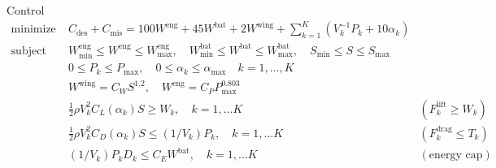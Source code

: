 \begin{chapter}{Control}
    \[\begin{array}{lll}
    \text{minimize} \; & C_{\mathrm{des}} + C_{\mathrm{mis}} = 100W^{\mathrm{eng}} + 45W^{\mathrm{bat}} + 2W^{\mathrm{wing}} + \sum_{k=1}^{K}\left(V_k^{-1}P_k + 10\alpha_k \right) &  \\
    \text{subject to} 
                      & W_{\min }^{\mathrm{eng}} \leq W^{\mathrm{eng}} \leq W_{\max }^{\mathrm{eng}},
                      \quad W_{\min }^{\mathrm{bat}} \leq W^{\mathrm{bat}} \leq W_{\max }^{\mathrm{bat}}, 
                      \quad S_{\min } \leq S \leq S_{\max } & \\
                      & 0 \le P_k \le P_{\mathrm{max}}, \quad 0 \le \alpha_k \le \alpha_{\mathrm{max}} \quad k = 1, \ldots, K & \\
                      & W^{\mathrm{wing}} = C_{W}S^{1.2}, \quad W^{\mathrm{eng}} = C_P P_{\mathrm{max}}^{0.803} & \\
                      & \frac{1}{2} \rho V_k^2 C_L\left(\alpha_k\right) S \ge W_k, \quad k = 1, \ldots K & (F_{k}^{\mathrm{lift}} \ge W_k) \\
                      & \frac{1}{2} \rho V_k^2 C_D\left(\alpha_k\right) S \le (1/V_k)P_k, \quad k = 1, \ldots K & (F_{k}^{\mathrm{drag}} \le T_k) \\
                    & (1/V_k) P_k D_k \le C_{E}W^{\mathrm{bat}}, \quad k = 1, \ldots K & (\text{energy cap})
    \end{array}\]




\end{chapter}
